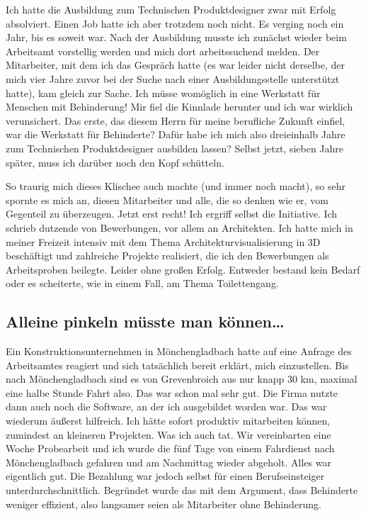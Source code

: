 \documentclass[fontsize=14pt,a4paper,headinclude,DIV=calc,automark]{scrbook}
\begin{document}
Ich hatte die Ausbildung zum Technischen Produktdesigner zwar mit Erfolg absolviert. Einen Job hatte ich aber trotzdem noch nicht. Es verging noch ein Jahr, bis es soweit war. Nach der Ausbildung musste ich zunächst wieder beim Arbeitsamt vorstellig werden und mich dort arbeitssuchend melden. Der Mitarbeiter, mit dem ich das Gespräch hatte (es war leider nicht derselbe, der mich vier Jahre zuvor bei der Suche nach einer Ausbildungsstelle unterstützt hatte), kam gleich zur Sache. Ich müsse womöglich in eine Werkstatt für Menschen mit Behinderung! Mir fiel die Kinnlade herunter und ich war wirklich verunsichert. Das erste, das diesem Herrn für meine berufliche Zukunft einfiel, war die Werkstatt für Behinderte? Dafür habe ich mich also dreieinhalb Jahre zum Technischen Produktdesigner ausbilden lassen? Selbst jetzt, sieben Jahre später, muss ich darüber noch den Kopf schütteln.

So traurig mich dieses Klischee auch machte (und immer noch macht), so sehr spornte es mich an, diesen Mitarbeiter und alle, die so denken wie er, vom Gegenteil zu überzeugen. Jetzt erst recht! Ich ergriff selbst die Initiative. Ich schrieb dutzende von Bewerbungen, vor allem an Architekten. Ich hatte mich in meiner Freizeit intensiv mit dem Thema Architekturvisualisierung in 3D beschäftigt und zahlreiche Projekte realisiert, die ich den Bewerbungen als Arbeitsproben beilegte. Leider ohne großen Erfolg. Entweder bestand kein Bedarf oder es scheiterte, wie in einem Fall, am Thema Toilettengang.

\subsection{Alleine pinkeln müsste man können…}

Ein Konstruktionsunternehmen in Mönchengladbach hatte auf eine Anfrage des Arbeitsamtes reagiert und sich tatsächlich bereit erklärt, mich einzustellen. Bis nach Mönchengladbach sind es von Grevenbroich aus nur knapp 30 km, maximal eine halbe Stunde Fahrt also. Das war schon mal sehr gut. Die Firma nutzte dann auch noch die Software, an der ich ausgebildet worden war. Das war wiederum äußerst hilfreich. Ich hätte sofort produktiv mitarbeiten können, zumindest an kleineren Projekten. Was ich auch tat. Wir vereinbarten eine Woche Probearbeit und ich wurde die fünf Tage von einem Fahrdienst nach Mönchengladbach gefahren und am Nachmittag wieder abgeholt. Alles war eigentlich gut. Die Bezahlung war jedoch selbst für einen Berufseinsteiger unterdurchschnittlich. Begründet wurde das mit dem Argument, dass Behinderte weniger effizient, also langsamer seien als Mitarbeiter ohne Behinderung.
\end{document}
